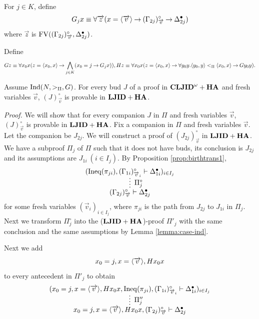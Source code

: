 For $j \in K$, define
\[
G_jx \equiv \forall \overrightarrow z(x=\langle\overrightarrow v\rangle \mathbin \to (\Gamma_{2j})^\circ_{\overrightarrow v} \mathbin \to \Delta_{2j}^\bullet)
\]
where $\Vec z$ is ${{\rm FV}}((\Gamma_{2j})^\circ_{\overrightarrow v},\Delta_{2j}^\bullet)$.

Define
\[
Gz \equiv \forall x_0x(z=\langle x_0,x\rangle \mathbin \to \displaystyle \mathop \bigwedge_{j \in K} (x_0=j \mathbin \to G_jx)), \\
Hz \equiv \forall x_0x(z=\langle x_0,x\rangle \mathbin \to \forall y_0y.\langle y_0,y\rangle <_\Pi \langle x_0,x\rangle \mathbin \to Gy_0y).
\]

\begin{Lemma}\label{lemma:prooftrans}
Assume ${\rm Ind}(N,>_\Pi,G)$.
For every bud $J$ of a proof in ${{\bf CLJID}^\omega+{\bf HA}}$ and fresh variables $\Vec v$,
$(J)^\circ_{\Vec v}$ is provable in ${{\bf LJID}+{\bf HA}}$.
\end{Lemma}

{\em Proof.}
We will show that 
for every companion $J$ in $\Pi$ and fresh variables $\Vec v$,
$(J)^\circ_{\Vec v}$ is provable in ${{\bf LJID}+{\bf HA}}$.
Fix a companion in $\Pi$ and fresh variables $\Vec v$.
Let the companion be $J_{2j}$.
We will construct a proof of $(J_{2j})^\circ_{\Vec v}$ in ${{\bf LJID}+{\bf HA}}$.
We have a subproof $\Pi_j$ of $\Pi$ 
such that it does not have buds,
its conclusion is $J_{2j}$ and its assumptions are
$J_{1i} \ (i \in I_j)$. 
By Proposition \ref{prop:birthtrans1},
\[
\infer*[\Pi_j^\circ]{(\Gamma_{2j})^\circ_{\Vec v} \prove \Delta_{2j}^\bullet}{
(\Ineq(\pi_{ji}), (\Gamma_{1i})^\circ_{\Vec v_i} \prove \Delta_{1i}^\bullet)
_{i \in I_j}
}
\]
for some fresh variables $(\Vec v_i)_{i \in I_j}$,
where
$\pi_{ji}$ is the path from $J_{2j}$ to $J_{1i}$ in $\Pi_j$.
Next we transform $\Pi_j^\circ$ 
into the (${{\bf LJID}+{\bf HA}}$)-proof $\Pi'_j$ 
with the same conclusion and the same assumptions
by Lemma \ref{lemma:case-ind}.

Next we add
\[
x_0=j,x=\langle\overrightarrow v\rangle,Hx_0x
\]
to every antecedent in $\Pi'_j$ 
to obtain 
\[
\infer*[\Pi''_j]{x_0=j,x=\<\Vec v\>,Hx_0x,(\Gamma_{2j})^\circ_{\Vec v} \prove \Delta^\bullet_{2j}}{
(x_0=j,x=\<\Vec v\>,Hx_0x,\Ineq(\pi_{ji}),(\Gamma_{1i})^\circ_{\Vec v_i} \prove \Delta^\bullet_{1i})
_{i \in I_j}
}
\]

